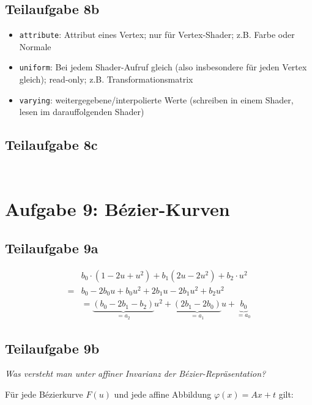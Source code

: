 \documentclass[a4paper]{scrartcl}
\begin{document}
\subsection*{Teilaufgabe 8b}
\begin{itemize}
    \item \texttt{attribute}: Attribut eines Vertex; nur für Vertex-Shader; z.B. Farbe oder Normale
    \item \texttt{uniform}: Bei jedem Shader-Aufruf gleich (also insbesondere für jeden Vertex gleich); read-only; z.B. Transformationsmatrix
    \item \texttt{varying}: weitergegebene/interpolierte Werte (schreiben in einem Shader, lesen im darauffolgenden Shader)
\end{itemize}

\subsection*{Teilaufgabe 8c}
\inputminted[linenos, numbersep=5pt, tabsize=4, frame=lines, label=shader.vert]{glsl}{shader.vert}

\inputminted[linenos, numbersep=5pt, tabsize=4, frame=lines, label=shader.frag]{glsl}{shader.frag}


\section*{Aufgabe 9: Bézier-Kurven}
\subsection*{Teilaufgabe 9a}

\begin{align}
     & b_0 \cdot (1-2u + u^2) + b_1 (2u - 2u^2) + b_2 \cdot u^2\\
    =& b_0 - 2 b_0 u + b_0 u^2 + 2 b_1 u - 2 b_1 u^2 + b_2 u^2\\
    &= \underbrace{(b_0 - 2 b_1 - b_2)}_{= a_2} u^2  + \underbrace{(2 b_1 - 2 b_0)}_{= a_1} u + \underbrace{b_0}_{= a_0}
\end{align}

\subsection*{Teilaufgabe 9b}
\textit{Was versteht man unter affiner Invarianz der Bézier-Repräsentation?}

Für jede Bézierkurve $F(u)$ und jede affine Abbildung $\varphi(x) = A x + t$ gilt:
\end{document}
